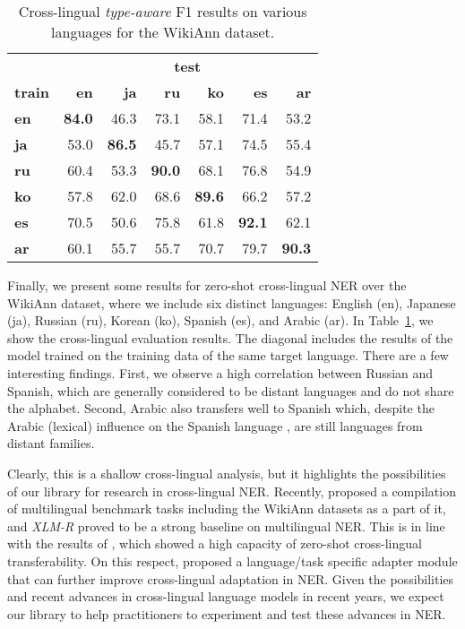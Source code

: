 \documentclass[11pt,a4paper]{article}
\begin{document}
\begin{table}
\centering
\begin{tabular}{l|rrrrrr}
\hline
& \multicolumn{6}{c}{\textbf{test}} \\
\textbf{train} & \textbf{en}    & \textbf{ja}    & \textbf{ru}    & \textbf{ko}    & \textbf{es}    & \textbf{ar}    \\ \hline
\textbf{en} & \textbf{84.0} & 46.3          & 73.1          & 58.1          & 71.4          & 53.2          \\\hline
\textbf{ja} & 53.0           & \textbf{86.5} & 45.7          & 57.1           & 74.5          & 55.4          \\\hline
\textbf{ru} & 60.4          & 53.3          & \textbf{90.0} & 68.1          & 76.8          & 54.9          \\\hline
\textbf{ko} & 57.8          & 62.0          & 68.6          & \textbf{89.6} & 66.2          & 57.2           \\\hline
\textbf{es} & 70.5          & 50.6          & 75.8          & 61.8          & \textbf{92.1} & 62.1          \\\hline
\textbf{ar} & 60.1          & 55.7          & 55.7          & 70.7          & 79.7          & \textbf{90.3} \\ \hline
\end{tabular}
\caption{\label{cross-lingual-result}
Cross-lingual \textit{type-aware} F1 results on various languages for the WikiAnn dataset.}

\end{table}


Finally, we present some results for zero-shot cross-lingual NER over the WikiAnn dataset, where we include six distinct languages: English (en), Japanese (ja), Russian (ru), Korean (ko), Spanish (es), and Arabic (ar). In Table~\ref{cross-lingual-result}, we show the cross-lingual evaluation results. The diagonal includes the results of the model trained on the training data of the same target language. 
There are a few interesting findings. First, we observe a high correlation between Russian and Spanish, which are generally considered to be distant languages and do not share the alphabet.
Second, Arabic also transfers well to Spanish which, despite the Arabic (lexical) influence on the Spanish language \cite{stewart1999spanish}, are still languages from distant families.

Clearly, this is a shallow cross-lingual analysis, but it highlights the possibilities of our library for research in cross-lingual NER. 
Recently, \citep{hu20icml} proposed a compilation of multilingual benchmark tasks including the WikiAnn datasets as a part of it, and {\it XLM-R} proved to be a strong baseline on multilingual NER. This is in line with the results of , which showed a high capacity of zero-shot cross-lingual transferability. On this respect,  proposed a language/task specific adapter module that can further improve cross-lingual adaptation in NER. 
Given the possibilities and recent advances in cross-lingual language models in recent years, we expect our library to help practitioners to experiment and test these advances in NER.
\end{document}
